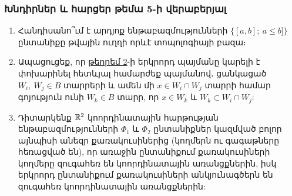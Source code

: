 \bigskip
\bigskip
\subsubsection*{Խնդիրներ և հարցեր թեմա 5-ի վերաբերյալ}

\begin{enumerate}[label=\thesection.\arabic*.]
\item Հանդիսանո՞ւմ է արդյոք ենթաբազմությունների $\{[a, b];\ a\le b]\}$ ընտանիքը թվային ուղղի որևէ տոպոլոգիայի բազա։

\item Ապացուցեք, որ \hyperref[ch5thm2]{թեորեմ 2}-ի երկրորդ պայմանը կարելի է փոխարինել հետև\-յալ համարժեք պայմանով․ ցանկացած  $W_i,\  W_j \in B$ տարրերի և ամեն մի \linebreak $x \in W_i \cap W_j$ տարրի համար գոյություն ունի $W_k \in B$ տարր, որ $x \in W_k$ և  \linebreak $W_k \subset W_i \cap W_j$: 

\item Դիտարկենք $\mathbb{R}^2$ կոորդինատային հարթության ենթաբազմությունների $\Phi_1$  \linebreak և $\Phi_2$ ընտանիքներ կազմված բոլոր այնպիսի անեզր քառակուսիներից (կող\-մերն ու գագաթները հեռացված են), որ առաջին ընտանիքում քառակուսիների \linebreak  կող\-մերը զուգահեռ են կոորդինատային առանցքներին, իսկ երկրորդ ընտա\-նի\-քում քառակուսիների անկյունագծերն են զուգահեռ կոորդինատային առանցք\-նե\-րին:


\begin{center}
\end{center}


\end{enumerate}
